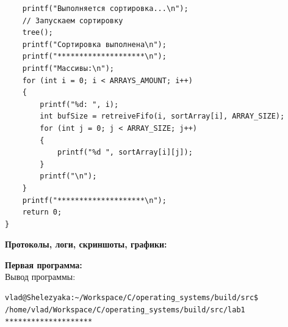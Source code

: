 \documentclass[a4paper,14pt]{extarticle}
\begin{document}
\begin{verbatim}
    printf("Выполняется сортировка...\n");
    // Запускаем сортировку
    tree();
    printf("Сортировка выполнена\n");
    printf("********************\n");
    printf("Массивы:\n");
    for (int i = 0; i < ARRAYS_AMOUNT; i++)
    {
        printf("%d: ", i);
        int bufSize = retreiveFifo(i, sortArray[i], ARRAY_SIZE);
        for (int j = 0; j < ARRAY_SIZE; j++)
        {
            printf("%d ", sortArray[i][j]);
        }
        printf("\n");
    }
    printf("********************\n");
    return 0;
}
\end{verbatim}

\textbf{Протоколы, логи, скриншоты, графики:}\bigbreak

\textbf{Первая программа:}\\
Вывод программы:\\
\begin{verbatim}
vlad@Shelezyaka:~/Workspace/C/operating_systems/build/src$ /home/vlad/Workspace/C/operating_systems/build/src/lab1
********************


\end{verbatim}
\end{document}
